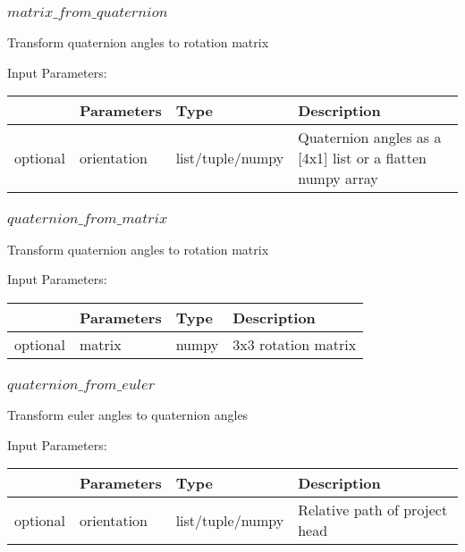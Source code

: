 \documentclass[
	ngerman,
	accentcolor=9c,%
	type=intern,
	marginpar=false
	]{tudapub}
\begin{document}
\subsubsection{$matrix\_from\_quaternion$}
\noindent Transform quaternion angles to rotation matrix


\vspace{0.5cm}
\noindent Input Parameters:
\vspace{0.5cm}

\begin{tabular}{|p{}|p{}|p{}| p{}|}
\hline
 & \textbf{Parameters} & \textbf{Type} & \textbf{Description} \\
\hline
optional & orientation & list/tuple/numpy & Quaternion angles as a [4x1] list or a flatten numpy array\\
\hline
\end{tabular}
\vspace{0.5cm}


\subsubsection{$quaternion\_from\_matrix$}
\noindent Transform quaternion angles to rotation matrix


\vspace{0.5cm}
\noindent Input Parameters:
\vspace{0.5cm}

\begin{tabular}{|p{}|p{}|p{}| p{}|}
\hline
 & \textbf{Parameters} & \textbf{Type} & \textbf{Description} \\
\hline
optional & matrix & numpy & 3x3 rotation matrix\\
\hline
\end{tabular}
\vspace{0.5cm}


\subsubsection{$quaternion\_from\_euler$}
\noindent Transform euler angles to quaternion angles


\vspace{0.5cm}
\noindent Input Parameters:
\vspace{0.5cm}

\begin{tabular}{|p{}|p{}|p{}| p{}|}
\hline
 & \textbf{Parameters} & \textbf{Type} & \textbf{Description} \\
\hline
optional & orientation & list/tuple/numpy & Relative path of project head\\
\hline
\end{tabular}
\vspace{0.5cm}
\end{document}

